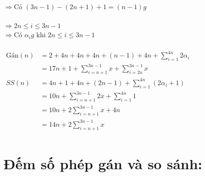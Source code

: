 \documentclass[12pt, letterpaper]{article}
\begin{document}
 \\
$\Rightarrow \text{Có } (3n - 1) - (2n + 1) + 1 = (n - 1)g$ \\
 \\
$\Rightarrow 2n \leq i \leq 3n - 1$ \\
$\Rightarrow \text{Có } \alpha_ig \text{ khi }  2n \leq i \leq 3n - 1$\\
 \\
$ \begin{aligned}
    \text{Gán}(n) & = 2 + 4n + 4n + 4n + (n - 1) + 4n + \sum^{4n}_{i = 1} 2 \alpha_i \\
        & = 17n + 1 + \sum^{3n-1}_{i = n + 1} x + \sum^{3n-1}_{i = 2n} x\\
    SS(n) & = 4n + 1 + 4n + (2n - 1) + \sum^{4n}_{i = 1} (2 \alpha_i + 1) \\
        & = 10n + \sum^{3n-1}_{i = n + 1} 2x + \sum^{4n}_{i = 1} 1 \\
        & = 10n + 2 \sum^{3n-1}_{i = n + 1} x + 4n \\
        & = 14n + 2 \sum^{3n-1}_{i = n + 1} x \\
\end{aligned} $ \\

\section{Đếm số phép gán và so sánh:}
\end{document}
